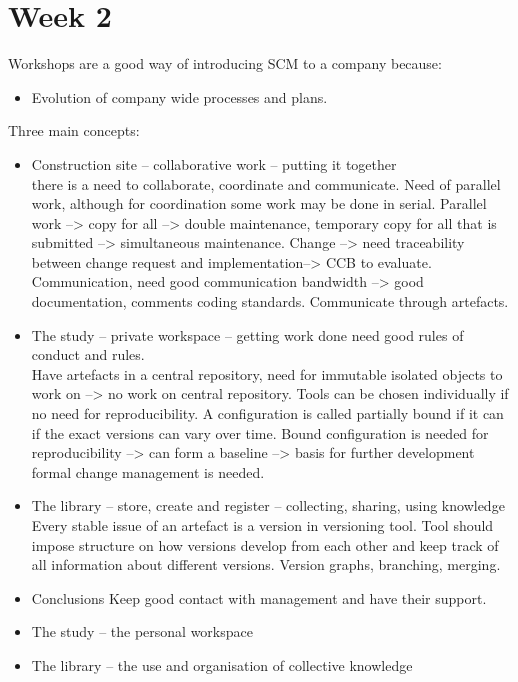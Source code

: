 \documentclass{article}
\begin{document}
\section{Week 2}
Workshops are a good way of introducing SCM  to a company because:

\begin{itemize}
    \item Evolution of company wide processes and plans.
\end{itemize}
Three main concepts:
\begin{itemize}
    \item Construction site -- collaborative work -- putting it together \\there is a need to collaborate, coordinate and communicate. Need of parallel work, although for coordination some work may be done in serial. Parallel work --> copy for all --> double maintenance, temporary copy for all that is submitted --> simultaneous maintenance. Change --> need traceability between change request and implementation--> CCB to evaluate. Communication, need good communication bandwidth --> good documentation, comments coding standards. Communicate through artefacts.
    \item The study -- private workspace -- getting work done need good rules of conduct and rules. \\
    Have artefacts in a central repository, need for immutable isolated objects to work on --> no work on central repository. Tools can be chosen individually if no need for reproducibility. A configuration is called partially bound if it can if the exact versions can vary over time. Bound configuration is needed for reproducibility --> can form a baseline --> basis for further development formal change management is needed.
    \item The library -- store, create and register -- collecting, sharing, using knowledge  \\
    Every stable issue of an artefact is a version in versioning tool. Tool should impose structure on how versions develop from each other and keep track of all information about different versions. Version graphs, branching, merging.
    \item Conclusions Keep good contact with management and have their support.
    \item The study -- the personal workspace
    \item The library -- the use and organisation of collective knowledge
\end{itemize}
\end{document}
